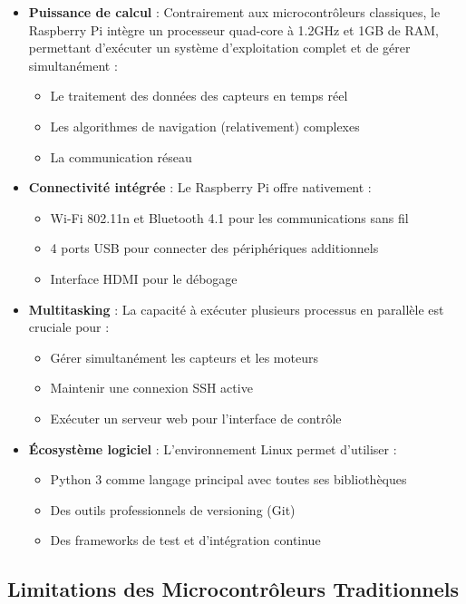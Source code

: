 \documentclass[a4paper, 12pt]{article}
\begin{document}
	\begin{itemize}
		\item \textbf{Puissance de calcul} : Contrairement aux microcontrôleurs classiques, le Raspberry Pi intègre un processeur quad-core à 1.2GHz et 1GB de RAM, permettant d'exécuter un système d'exploitation complet et de gérer simultanément :
		\begin{itemize}
			\item Le traitement des données des capteurs en temps réel
			\item Les algorithmes de navigation (relativement) complexes
			\item La communication réseau
		\end{itemize}
		
		\item \textbf{Connectivité intégrée} : Le Raspberry Pi offre nativement :
		\begin{itemize}
			\item Wi-Fi 802.11n et Bluetooth 4.1 pour les communications sans fil
			\item 4 ports USB pour connecter des périphériques additionnels
			\item Interface HDMI pour le débogage
		\end{itemize}
		
		\item \textbf{Multitasking} : La capacité à exécuter plusieurs processus en parallèle est cruciale pour :
		\begin{itemize}
			\item Gérer simultanément les capteurs et les moteurs
			\item Maintenir une connexion SSH active
			\item Exécuter un serveur web pour l'interface de contrôle
		\end{itemize}
		
		\item \textbf{Écosystème logiciel} : L'environnement Linux permet d'utiliser :
		\begin{itemize}
			\item Python 3 comme langage principal avec toutes ses bibliothèques
			\item Des outils professionnels de versioning (Git)
			\item Des frameworks de test et d'intégration continue
		\end{itemize}
	\end{itemize}
	
	\subsection{Limitations des Microcontrôleurs Traditionnels}
	
\end{document}
